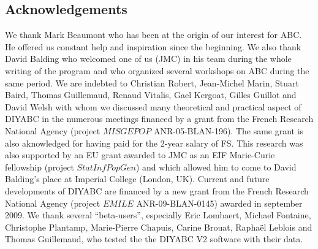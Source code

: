 \documentclass [a4paper]{report}
\let\subsectionv\subsection
\renewcommand{\subsection}[1]{\subsectionv{#1} \setcounter{paragraph}{0}}
\begin{document}
\subsection{Acknowledgements}
We thank Mark Beaumont who has been at the origin of our interest for ABC. He offered us constant help and inspiration since the beginning. We also thank David Balding who welcomed one of us (JMC) in his team during the whole writing of the program and who organized several workshops on ABC during the same period. We are indebted to Christian Robert, Jean-Michel Marin, Stuart Baird, Thomas Guillemaud, Renaud Vitalis, Gael Kergoat, Gilles Guillot and David Welsh with whom we discussed many theoretical and practical aspect of DIYABC in the numerous meetings financed by a grant from the French Research National Agency (project $MISGEPOP$ ANR-05-BLAN-196). The same grant is also aknowledged for having paid for the 2-year salary of FS. This research was also supported by an EU grant awarded to JMC as an EIF Marie-Curie fellowship (project $StatInfPopGen$) and which allowed him to come to David Balding's place at Imperial College (London, UK). Current and future developments of DIYABC are financed by a new grant from the French Research National Agency (project $EMILE$ ANR-09-BLAN-0145) awarded in september 2009. We thank several “beta-users”, especially Eric Lombaert, Michael Fontaine, Christophe Plantamp, Marie-Pierre Chapuis, Carine Brouat, Raphaël Leblois and Thomas Guillemaud, who tested the the DIYABC V2 software with their data.

\newpage




\end{document}
